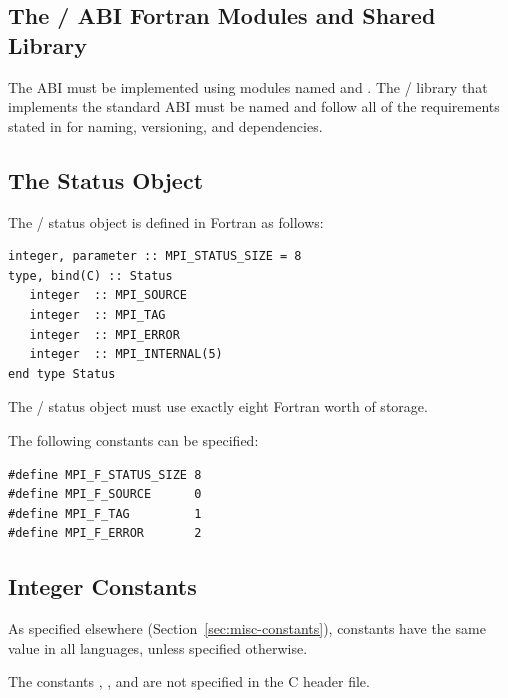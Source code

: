 \subsection{The \texorpdfstring{\MPI/}{MPI} ABI Fortran Modules and Shared Library}
\label{subsec:fortran-abi-names}

The ABI must be implemented using modules named  and .
The \MPI/ library that implements the standard ABI must be
named  and follow all of the requirements stated in
 for naming, versioning, and dependencies.

\subsection{The Status Object}
\label{subsec:fortran-abi-status}

The \MPI/ status object is defined in Fortran as follows:
\begin{lstlisting}[language={[MPI]Fortran}]
integer, parameter :: MPI_STATUS_SIZE = 8
type, bind(C) :: Status
   integer  :: MPI_SOURCE
   integer  :: MPI_TAG
   integer  :: MPI_ERROR
   integer  :: MPI_INTERNAL(5)
end type Status
\end{lstlisting}
The \MPI/ status object must use exactly eight Fortran  worth of storage.

The following constants can be specified:
\begin{lstlisting}[language={[MPI]C}]
#define MPI_F_STATUS_SIZE 8
#define MPI_F_SOURCE      0
#define MPI_F_TAG         1
#define MPI_F_ERROR       2
\end{lstlisting}

\subsection{Integer Constants}

As specified elsewhere (Section~\ref{sec:misc-constants}),
constants have the same value in all languages, unless specified otherwise.

\begin{sloppy}
The constants
, ,
 and 
are not specified in the C header file.

\end{sloppy}

